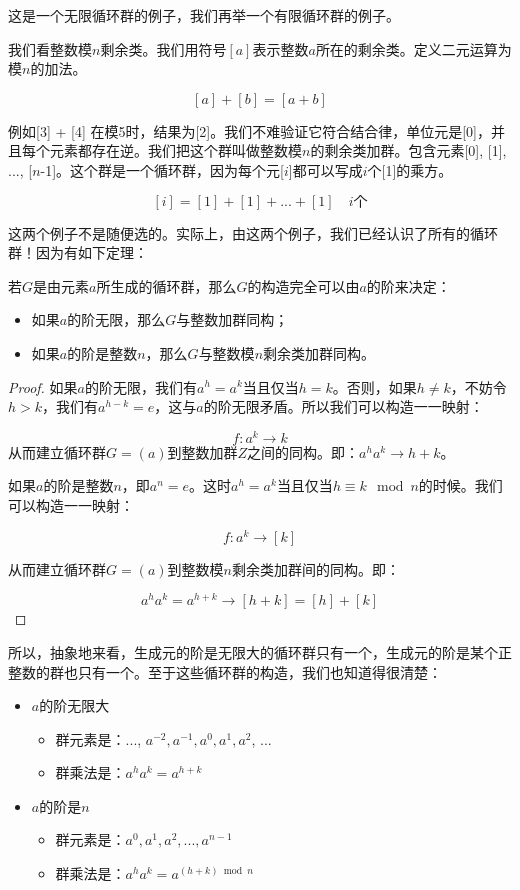 \documentclass[b5paper]{ctexart}
\begin{document}
这是一个无限循环群的例子，我们再举一个有限循环群的例子。

\begin{example}
我们看整数模$n$剩余类。我们用符号$[a]$表示整数$a$所在的剩余类。定义二元运算为模$n$的加法。

\[
[a] + [b] = [a + b]
\]

例如[3] + [4] 在模5时，结果为[2]。我们不难验证它符合结合律，单位元是[0]，并且每个元素都存在逆。我们把这个群叫做整数模$n$的剩余类加群。包含元素[0], [1], ..., [$n$-1]。这个群是一个循环群，因为每个元[$i$]都可以写成$i$个[1]的乘方。

\[
[i] = [1] + [1] + ... + [1] \quad \text{$i$个}
\]
\end{example}

这两个例子不是随便选的。实际上，由这两个例子，我们已经认识了所有的循环群！因为有如下定理：

\begin{theorem}
若$G$是由元素$a$所生成的循环群，那么$G$的构造完全可以由$a$的阶来决定：
\begin{itemize}
\item 如果$a$的阶无限，那么$G$与整数加群同构；
\item 如果$a$的阶是整数$n$，那么$G$与整数模$n$剩余类加群同构。
\end{itemize}
\end{theorem}

\begin{proof}
如果$a$的阶无限，我们有$a^h = a^k$当且仅当$h = k$。否则，如果$h \neq k$，不妨令$h > k$，我们有$a^{h - k} = e$，这与$a$的阶无限矛盾。所以我们可以构造一一映射：

\[
f: a^k \to k
\]
从而建立循环群$G=(a)$到整数加群$Z$之间的同构。即：$a^ha^k \to h + k$。

如果$a$的阶是整数$n$，即$a^n = e$。这时$a^h = a^k$当且仅当$h \equiv k \mod n$的时候。我们可以构造一一映射：

\[
f: a^k \to [k]
\]

从而建立循环群$G = (a)$到整数模$n$剩余类加群间的同构。即：

\[
a^ha^k = a^{h + k} \to [h + k] = [h] + [k]
\]
\end{proof}

所以，抽象地来看，生成元的阶是无限大的循环群只有一个，生成元的阶是某个正整数的群也只有一个。至于这些循环群的构造，我们也知道得很清楚：

\begin{itemize}
\item $a$的阶无限大
  \begin{itemize}
  \item 群元素是：..., $a^{-2}, a^{-1}, a^0, a^1, a^2$, ...
  \item 群乘法是：$a^ha^k = a^{h + k}$
  \end{itemize}
\item $a$的阶是$n$
  \begin{itemize}
  \item 群元素是：$a^0, a^1, a^2, ..., a^{n-1}$
  \item 群乘法是：$a^ha^k = a^{(h + k) \bmod n}$
  \end{itemize}
\end{itemize}
\end{document}
